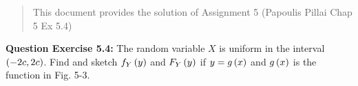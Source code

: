 \documentclass[journal,12pt,twocolumn]{IEEEtran}
\begin{document}
% 
\maketitle
\newpage
\bigskip

\begin{abstract}
This document provides the solution of Assignment 5 (Papoulis Pillai Chap 5 Ex 5.4)
\end{abstract}

\textbf{Question Exercise 5.4:} The random variable $X$ is uniform in the interval $\left(-2c,2c\right)$. Find and sketch $f_{Y}\left(y\right)$ and $F_{Y}\left(y\right)$ if $y = g\left(x\right)$ and $g\left(x\right)$ is the function in Fig. 5-3.
\end{document}
